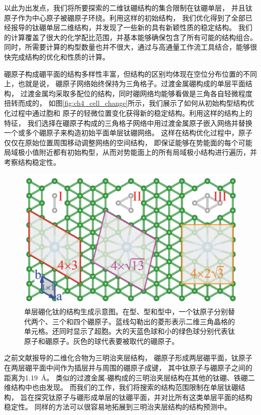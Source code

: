 以此为出发点，我们将所要探索的二维钛硼结构的集合限制在钛硼单层，
并且钛原子作为中心原子被硼原子环绕。利用这样的初始结构，
我们优化得到了全部已经报导的钛硼单层二维结构，并发现了一些新的具有新颖性质的稳定结构。
我们的计算覆盖了很大的化学配比范围，并基本能够确保包含了所有可能的结构组合。
同时，所需要计算的构型数量也并不很大，通过与高通量工作流工具结合，能够很快完成结构的优化和性质的计算。

硼原子构成硼平面的结构多样性丰富，但结构的区别均体现在空位分布位置的不同上，也就是说，
硼原子网络始终保持为三角格子。过渡金属硼构成的单层平面结构，
过渡金属均采取多配位的结构，同时硼网络均能够看做是三角各自轻微程度扭转而成的，
如图\ref{fig:ch4_cell_change}所示，我们展示了如何从初始构型结构优化过程中通过胞和
原子的轻微位置变化获得新的稳定结构。利用这样的结构上的特征，
我们选择在硼原子构成的三角格子网络中用过渡金属原子嵌入网络并替换一个或多个硼原子来构造初始平面单层钛硼网络。
这样在结构优化过程中，原子仅仅在原始位置周围移动调整网络的空间结构，
即保证能够在势能面的每个可能局域极小值附近都有初始构型，从而对势能面上的所有局域极小结构进行遍历，并考察结构稳定性。


\begin{figure}
  \includegraphics[width=1.0\textwidth]{figs/ch5_how_cell_choose.png}
  \centering
  \caption{单层硼化钛的结构生成示意图。在型、型和型中，一个钛原子分别替代两个、三个和四个硼原子。蓝线勾勒出的菱形表示二维三角晶格的单元格。还同时显示了超胞。大的天蓝色球和小的绿色球分别代表钛原子和硼原子。灰色的球代表要被取代的硼原子。}
  \label{fig:ch5_how_cell_choose}
\end{figure}

之前文献报导的二维化合物为三明治夹层结构\cite{zhang2014prediction}，
硼原子形成两层硼平面，钛原子在两层硼平面中间作为插层并与周围的硼原子成键，
其中钛原子与硼原子之间的距离为\SI{1.19}{\angstrom}。
类似的过渡金属-硼构成的三明治夹层结构在其他的钛硼、铁硼二维结构中也由发现。
而我们的工作，我们将搜索的结构范围限制在单层钛硼结构，
旨在探究钛原子与硼形成单层的钛硼平面，并对比所有这类单层平面的结构稳定性。
同样的方法可以很容易地拓展到三明治夹层结构的结构预测中。

